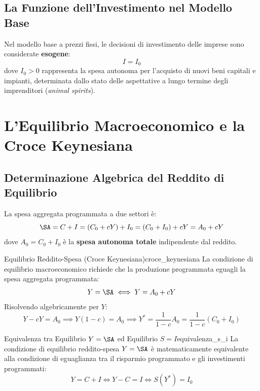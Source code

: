 \subsection{La Funzione dell'Investimento nel Modello Base}
Nel modello base a prezzi fissi, le decisioni di investimento delle imprese sono considerate \textbf{esogene}:
\begin{equation}
    I = I_0
\end{equation}
dove $I_0 > 0$ rappresenta la spesa autonoma per l'acquisto di nuovi beni capitali e impianti, determinata dallo stato delle aspettative a lungo termine degli imprenditori (\textit{animal spirits}).

\section{L'Equilibrio Macroeconomico e la Croce Keynesiana}

\subsection{Determinazione Algebrica del Reddito di Equilibrio}
La spesa aggregata programmata a due settori è:
\begin{equation}
    \SA = C + I = (C_0 + c Y) + I_0 = (C_0 + I_0) + c Y = A_0 + c Y
\end{equation}
dove $A_0 = C_0 + I_0$ è la \textbf{spesa autonoma totale} indipendente dal reddito.

\begin{modello}{Equilibrio Reddito-Spesa (Croce Keynesiana)}{croce_keynesiana}
La condizione di equilibrio macroeconomico richiede che la produzione programmata eguagli la spesa aggregata programmata:
\begin{equation}
    Y = \SA \iff Y = A_0 + c Y
\end{equation}
Risolvendo algebricamente per $Y$:
\begin{equation}
    Y - c Y = A_0 \implies Y(1 - c) = A_0 \implies Y^* = \frac{1}{1 - c} A_0 = \frac{1}{1 - c} (C_0 + I_0)
\end{equation}
\end{modello}

\begin{teorema}{Equivalenza tra Equilibrio $Y = \SA$ ed Equilibrio $S = I$}{equivalenza_s_i}
La condizione di equilibrio reddito-spesa $Y = \SA$ è matematicamente equivalente alla condizione di eguaglianza tra il risparmio programmato e gli investimenti programmati:
\begin{equation}
    Y = C + I \iff Y - C = I \iff S(Y^*) = I_0
\end{equation}
\end{teorema}


